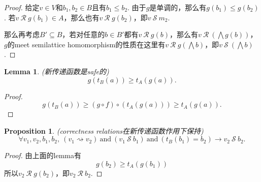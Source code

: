 \documentclass{article}
\newtheorem{lemma}[theorem]{Lemma}
\newtheorem{proposition}[theorem]{Proposition}
\begin{document}
\begin{proof}
给定$v \in V$和$b_1,b_2 \in B$且有$b_1 \leq b_2$. 由于$g$是单调的，那么有$g(b_1) \leq g(b_2)$. 若$v~\mathcal{R}~g(b_1) \in A$，那么也有$v~\mathcal{R}~g(b_2)$，即$v~\mathcal{S}~m_2$.

那么再考虑$B' \subseteq B$，若对任意的$b \in B'$都有$v~\mathcal{R}~g(b)$，那么有$v ~\mathcal{R}~(\bigwedge g(b))$，$g$的meet semilattice homomorphism的性质在这里有$v~\mathcal{R}~g(\bigwedge b)$，即$v~\mathcal{S}~(\bigwedge b)$.
\end{proof}

\begin{lemma} \rm {\color{red}(新传递函数是safe的)}
$$
g(t_B(a)) \geq t_A(g(a)).
$$
\end{lemma}

\begin{proof}
$$
g(t_B(a)) \geq (g \circ f)\circ (t_A(g(a))) \geq t_A(g(a)).
$$
\end{proof}

\begin{proposition}
\rm {\color{red}(correctness relations在新传递函数作用下保持)}
$$
\forall v_1,v_2,b_1,b_2,~(v_1 \rightsquigarrow v_2)~\text{and}~(v_1 ~\mathcal{S}~b_1)~\text{and}~(t_B(b_1) = b_2) \rightarrow v_2~\mathcal{S}~ b_2.
$$
\end{proposition}

\begin{proof}
由上面的lemma有
$$
g(b_2) \geq t_A(g(b_1))
$$
所以$v_2~\mathcal{R}~g(b_2)$，即$v_2~\mathcal{R}~b_2$.
\end{proof}
\end{document}
